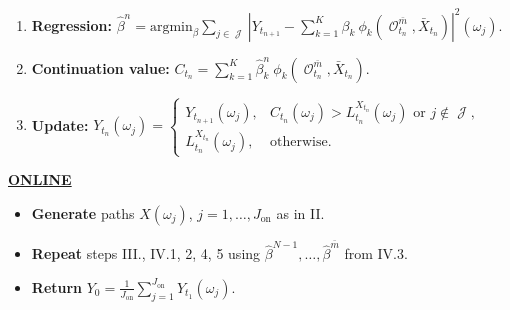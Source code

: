 \documentclass[11pt]{article}
\theoremstyle{plain}
\theoremstyle{definition}
\DeclareMathOperator{\calJ}{\mathcal{J}}
\DeclareMathOperator{\calO}{\mathcal{O}}
\begin{document}
\begin{algorithm}[H]
\begin{itemize}
\begin{enumerate}
    \item \textbf{Regression: } 
    $\hat{\beta}^n = \text{argmin}_{\beta} \sum_{j\in \calJ} \left | Y_{t_{n+1}}- \sum_{k=1}^K \beta_k \ \phi_k(\calO_{t_n}^{\bar{m}}, \bar{X}_{t_n})\right|^2(\omega_j)$.

     \item \textbf{Continuation value:} $C_{t_n} = \sum_{k=1}^K \hat{\beta}_k^n \ \phi_k(\calO_{t_n}^{\bar{m}}, \bar{X}_{t_n})$.
     
     \item \textbf{Update:} $Y_{t_n}(\omega_j) = \begin{cases}
         
         Y_{t_{n+1}}(\omega_j) , & C_{t_n}(\omega_j) > L_{t_n}^{X_{t_n}}(\omega_j) \text{ or } j\notin \calJ, \\
         L_{t_n}^{X_{t_n}}(\omega_j), & \text{otherwise}. 
     \end{cases}  $

\end{enumerate}
   \end{itemize}

\textbf{\underline{ONLINE}}   
\begin{itemize}
    \item[I'.] \textbf{Generate} paths $X(\omega_j)$,  $j=1,\ldots,J_{\text{on}}$ as in II.  

\item[II'.] \textbf{Repeat} steps III., IV.1, 2, 4, 5 using $\hat{\beta}^{N-1},\ldots, \hat{\beta}^{\bar{m}}$ from IV.3.

\item[III'.] \textbf{Return} $Y_0 =\frac{1}{J_{\text{on}}}\sum_{j=1}^{J_{\text{on}}} Y_{t_1}(\omega_j) $.
\end{itemize}

\end{algorithm}



\end{document}
